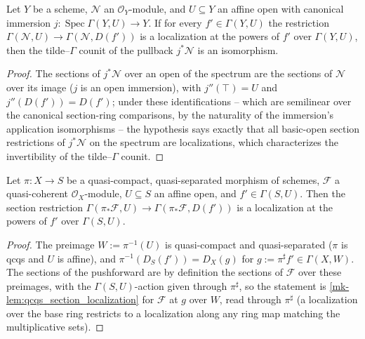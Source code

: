 \begin{lemma}
  \label{mk-lem:fromTildeGamma_pullback_fromSpec_converse}
  \leanok

  Let $Y$ be a scheme, $\mathcal{N}$ an $\mathcal{O}_Y$-module, and
  $U \subseteq Y$ an affine open with canonical immersion
  $j : \operatorname{Spec} \Gamma(Y, U) \to Y$. If for every
  $f' \in \Gamma(Y, U)$ the restriction
  $\Gamma(\mathcal{N}, U) \to \Gamma(\mathcal{N}, D(f'))$ is a localization at
  the powers of $f'$ over $\Gamma(Y, U)$, then the tilde--$\Gamma$ counit of
  the pullback $j^* \mathcal{N}$ is an isomorphism.
\end{lemma}
\begin{proof}
  \leanok
  The sections of $j^* \mathcal{N}$ over an open of the spectrum are the
  sections of $\mathcal{N}$ over its image ($j$ is an open immersion), with
  $j''(\top) = U$ and $j''(D(f')) = D(f')$; under these identifications --
  which are semilinear over the canonical section-ring comparisons, by the
  naturality of the immersion's application isomorphisms -- the hypothesis
  says exactly that all basic-open section restrictions of $j^* \mathcal{N}$
  on the spectrum are localizations, which characterizes the invertibility of
  the tilde--$\Gamma$ counit.
\end{proof}

\begin{lemma}
  \label{mk-lem:pushforward_section_localization}
  \leanok

  Let $\pi : X \to S$ be a quasi-compact, quasi-separated morphism of
  schemes, $\mathcal{F}$ a quasi-coherent $\mathcal{O}_X$-module,
  $U \subseteq S$ an affine open, and $f' \in \Gamma(S, U)$. Then the section
  restriction
  $\Gamma(\pi_* \mathcal{F}, U) \to \Gamma(\pi_* \mathcal{F}, D(f'))$ is a
  localization at the powers of $f'$ over $\Gamma(S, U)$.
\end{lemma}
\begin{proof}
  \leanok
  The preimage $W := \pi^{-1}(U)$ is quasi-compact and quasi-separated
  ($\pi$ is qcqs and $U$ is affine), and
  $\pi^{-1}(D_S(f')) = D_X(g)$ for $g := \pi^\sharp f' \in \Gamma(X, W)$. The
  sections of the pushforward are by definition the sections of
  $\mathcal{F}$ over these preimages, with the $\Gamma(S, U)$-action given
  through $\pi^\sharp$, so the statement is
  \ref{mk-lem:qcqs_section_localization} for $\mathcal{F}$ at $g$ over $W$,
  read through $\pi^\sharp$ (a localization over the base ring restricts to a
  localization along any ring map matching the multiplicative sets).
\end{proof}

